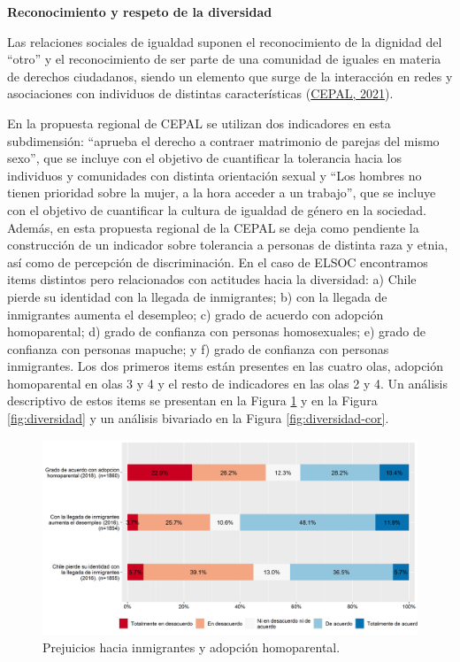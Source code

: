 \documentclass[
  12pt,
]{book}
\begin{document}
\textbf{Reconocimiento y respeto de la diversidad}

Las relaciones sociales de igualdad suponen el reconocimiento de la dignidad del ``otro'' y el reconocimiento de ser parte de una comunidad de iguales en materia de derechos ciudadanos, siendo un elemento que surge de la interacción en redes y asociaciones con individuos de distintas características (\protect\hyperlink{ref-cepal_Cohesion_2021}{CEPAL, 2021}).

En la propuesta regional de CEPAL se utilizan dos indicadores en esta subdimensión: ``aprueba el derecho a contraer matrimonio de parejas del mismo sexo'', que se incluye con el objetivo de cuantificar la tolerancia hacia los individuos y comunidades con distinta orientación sexual y ``Los hombres no tienen prioridad sobre la mujer, a la hora acceder a un trabajo'', que se incluye con el objetivo de cuantificar la cultura de igualdad de género en la sociedad. Además, en esta propuesta regional de la CEPAL se deja como pendiente la construcción de un indicador sobre tolerancia a personas de distinta raza y etnia, así como de percepción de discriminación. En el caso de ELSOC encontramos items distintos pero relacionados con actitudes hacia la diversidad: a) Chile pierde su identidad con la llegada de inmigrantes; b) con la llegada de inmigrantes aumenta el desempleo; c) grado de acuerdo con adopción homoparental; d) grado de confianza con personas homosexuales; e) grado de confianza con personas mapuche; y f) grado de confianza con personas inmigrantes. Los dos primeros items están presentes en las cuatro olas, adopción homoparental en olas 3 y 4 y el resto de indicadores en las olas 2 y 4. Un análisis descriptivo de estos items se presentan en la Figura \ref{fig:prejuicios} y en la Figura \ref{fig:diversidad} y un análisis bivariado en la Figura \ref{fig:diversidad-cor}.

\begin{figure}[H]

{\centering \includegraphics[width=1\linewidth,height=1\textheight]{output/graphs/prejuicios} 

}

\caption{Prejuicios hacia inmigrantes y adopción homoparental.}\label{fig:prejuicios}
\end{figure}
\end{document}
